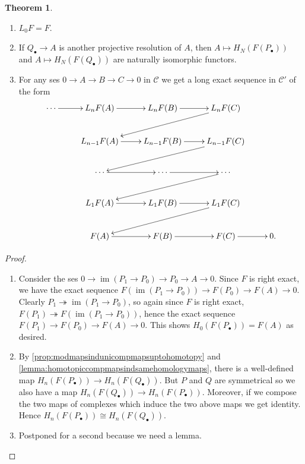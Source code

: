 \documentclass{article}
\newcommand{\im}{\operatorname{im}}
\newcommand{\ca}{\mathcal{C}}
\theoremstyle{definition}
\newtheorem{thm}[defn]{Theorem}
\begin{document}
\begin{thm}
\label{thm:derivfunc}
\begin{enumerate}
\item $L_0F=F$.
\item If $Q_\bullet\rightarrow A$ is another projective resolution of $A$, then $A\mapsto H_N(F(P_\bullet))$ and $A\mapsto H_N(F(Q_\bullet))$ are naturally isomorphic functors.
\item For any ses $0\rightarrow A\rightarrow B\rightarrow C\rightarrow 0$ in $\ca$ we get a long exact sequence in $\ca'$ of the form
\[
\xymatrix{
\cdots\ar[r] & L_nF(A)\ar[r] & L_nF(B)\ar[r] & L_nF(C) \ar[dll] \\
& L_{n-1}F(A) \ar[r] &L_{n-1}F(B) \ar[r] & L_{n-1}F(C)\ar[dll] \\
& \cdots\ar[r] & \cdots\ar[r] & \cdots\ar[dll] \\
& L_1F(A)\ar[r] & L_1F(B)\ar[r] & L_1F(C) \ar[dll] \\
& F(A)\ar[r] & F(B)\ar[r] & F(C)\ar[r] & 0 .
}
\]
\end{enumerate}
\end{thm}
\begin{proof}
\begin{enumerate}
\item Consider the ses $0\rightarrow\im(P_1\rightarrow P_0)\rightarrow P_0\rightarrow A\rightarrow 0$. Since $F$ is right exact, we have the exact sequence $F(\im(P_1\rightarrow P_0))\rightarrow F(P_0)\rightarrow F(A)\rightarrow 0$. Clearly $P_1\twoheadrightarrow \im(P_1\rightarrow P_0)$, so again since $F$ is right exact, $F(P_1)\twoheadrightarrow F(\im(P_1\rightarrow P_0))$, hence the exact sequence $F(P_1)\rightarrow F(P_0)\rightarrow F(A)\rightarrow 0$. This shows $H_0(F(P_\bullet))=F(A)$ as desired.
\item By \ref{prop:modmapsindunicompmapsuptohomotopy} and \ref{lemma:homotopiccompmapsindsamehomologymaps}, there is a well-defined map $H_n(F(P_\bullet))\rightarrow H_n(F(Q_\bullet))$. But $P$ and $Q$ are symmetrical so we also have a map $H_n(F(Q_\bullet))\rightarrow H_n(F(P_\bullet))$. Moreover, if we compose the two maps of complexes which induce the two above maps we get identity. Hence $H_n(F(P_\bullet))\cong H_n(F(Q_\bullet))$.
\item Postponed for a second because we need a lemma.
\end{enumerate}
\end{proof}
\end{document}
